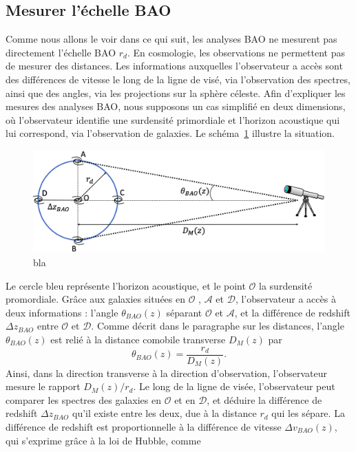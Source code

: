 \documentclass[11pt, twoside, a4paper, openright]{report}
\begin{document}
\subsection{Mesurer l'échelle BAO}

Comme nous allons le voir dans ce qui suit, les analyses BAO ne mesurent pas directement l'échelle BAO $r_{d}$. En cosmologie, les observations  ne permettent pas de mesurer des distances. Les informations auxquelles l'observateur a accès sont des différences de vitesse le long de la ligne de visé, via l'observation des spectres, ainsi que des angles, via les projections sur la sphère céleste. Afin d'expliquer les mesures des analyses BAO, nous supposons un cas simplifié en deux dimensions, où l'observateur identifie une surdensité primordiale et l'horizon acoustique qui lui correspond, via l'observation de galaxies. Le schéma~\ref{fig:bao_dessin} illustre la situation.
\begin{figure}
  \centering
  \label{fig:bao_dessin}
  \includegraphics[scale=0.40]{bao_dessin}
  \caption{bla}
\end{figure}
Le cercle bleu représente l'horizon acoustique, et le point $\mathcal{O}$ la surdensité promordiale. Grâce aux galaxies situées en $\mathcal{O}$ , $\mathcal{A}$  et $\mathcal{D}$, l'observateur a accès à deux informations : l'angle $\theta_{BAO}(z)$ séparant $\mathcal{O}$ et $\mathcal{A}$, et la différence de redshift $\Delta z_{BAO}$ entre $\mathcal{O}$ et $\mathcal{D}$. Comme décrit dans le paragraphe sur les distances, l'angle $\theta_{BAO}(z)$ est relié à la distance comobile transverse $D_M(z)$ par
\begin{equation}
  \label{eq:theta_bao}
  \theta_{BAO}(z) = \frac{r_d}{D_M(z)}.
\end{equation}
Ainsi, dans la direction transverse à la direction d'observation, l'observateur mesure le rapport $D_M(z) / r_d$. Le long de la ligne de visée, l'observateur peut comparer les spectres des galaxies en $\mathcal{O}$ et en $\mathcal{D}$, et déduire la différence de redshift $\Delta z_{BAO}$ qu'il existe entre les deux, due à la distance $r_d$ qui les sépare. La différence de redshift est proportionnelle à la différence de vitesse $\Delta v_{BAO}(z)$, qui s'exprime grâce à la loi de Hubble, comme
\end{document}
